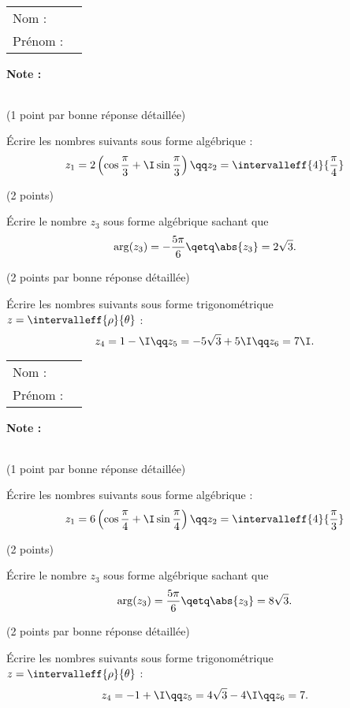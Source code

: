 \documentclass[10pt,french]{book}
\newcommand\competences{
\setcounter{exo}{0}
\begin{tabular}{ll} Nom : \\[5pt] Prénom : \end{tabular}
\hfill
\textbf{Note :}\renewcommand\arraystretch{2.3}
\begin{tabularx}{0.18\linewidth}{|X|}
\hline
\slashbox{\Huge\bfseries\phantom{10}}{\Huge\bfseries 10}\\
\hline
\end{tabularx}\renewcommand\arraystretch{1}\medskip
}
\begin{document}
\competences

\exo (1 point par bonne réponse détaillée)\par \'Ecrire les nombres suivants sous forme algébrique :
\[z_1 = 2\left(\cos \frac \pi 3 + \I \sin \frac\pi 3\right) \qq z_2 = \intervalleff{4}{\frac\pi 4}\]

\exo (2 points)\par \'Ecrire le nombre $z_3$ sous forme algébrique sachant que \[\arg(z_3) = -\frac{5\pi}{6} \qetq \abs{z_3} = 2\sqrt3.\]

\exo (2 points par bonne réponse détaillée)\par \'Ecrire les nombres suivants sous forme trigonométrique $z = \intervalleff{\rho}{\theta}$ :
\[z_4 = 1 - \I \qq z_5 = -5\sqrt 3 + 5\I \qq z_6 = 7\I.\]

\clearpage


\competences

\exo (1 point par bonne réponse détaillée)\par \'Ecrire les nombres suivants sous forme algébrique :
\[z_1 = 6\left(\cos \frac \pi 4 + \I \sin \frac\pi 4\right) \qq z_2 = \intervalleff{4}{\frac\pi 3}\]

\exo (2 points)\par \'Ecrire le nombre $z_3$ sous forme algébrique sachant que \[\arg(z_3) = \frac{5\pi}{6} \qetq \abs{z_3} = 8\sqrt3.\]

\exo (2 points par bonne réponse détaillée)\par \'Ecrire les nombres suivants sous forme trigonométrique $z = \intervalleff{\rho}{\theta}$ :
\[z_4 = -1 + \I \qq z_5 = 4\sqrt 3 - 4\I \qq z_6 = 7.\]
\end{document}
